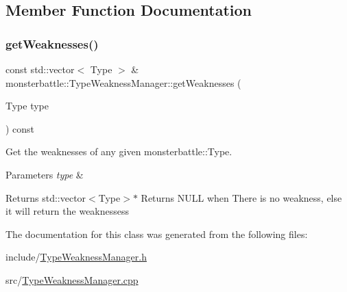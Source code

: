 \subsection{Member Function Documentation}
\mbox{\label{classmonsterbattle_1_1TypeWeaknessManager_a441bc5ce079cae18480cf1d435a5b6f9}} 
\subsubsection{\texorpdfstring{get\+Weaknesses()}{getWeaknesses()}}
{\footnotesize\ttfamily const std\+::vector$<$ Type $>$ \& monsterbattle\+::\+Type\+Weakness\+Manager\+::get\+Weaknesses (\begin{DoxyParamCaption}\item[{Type}]{type }\end{DoxyParamCaption}) const}



Get the weaknesses of any given monsterbattle\+::\+Type. 


\begin{DoxyParams}{Parameters}
{\em type} & \\
\hline
\end{DoxyParams}
\begin{DoxyReturn}{Returns}
std\+::vector$<$\+Type$>$$\ast$ Returns N\+U\+LL when There is no weakness, else it will return the weaknessess 
\end{DoxyReturn}


The documentation for this class was generated from the following files\+:\begin{DoxyCompactItemize}
\item 
include/\hyperlink{TypeWeaknessManager_8h}{Type\+Weakness\+Manager.\+h}\item 
src/\hyperlink{TypeWeaknessManager_8cpp}{Type\+Weakness\+Manager.\+cpp}\end{DoxyCompactItemize}

